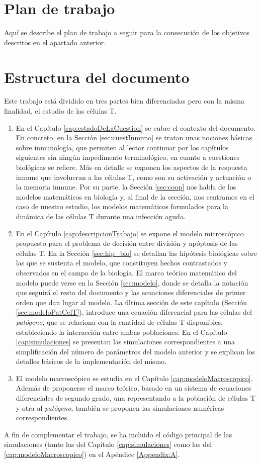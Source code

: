 \section{Plan de trabajo}
Aquí se describe el plan de trabajo a seguir para la consecución de los objetivos descritos en el apartado anterior.

\section{Estructura del documento}

Este trabajo está dividido en tres partes bien diferenciadas pero con la misma finalidad, el estudio de las células T. 

\begin{enumerate}
	\item En el Capítulo \ref{cap:estadoDeLaCuestion} se cubre el contexto del documento. En concreto, en la Sección \ref{sec:cuestInmuno} se tratan unas nociones básicas sobre inmunología, que permiten al lector continuar por los capítulos siguientes sin ningún impedimento terminológico, en cuanto a cuestiones biológicas se refiere. Más en detalle se exponen los aspectos de la respuesta inmune que involucran a las células T, como son su activación y actuación o la memoria inmune. Por su parte, la Sección \ref{sec:coop} nos habla de los modelos matemáticos en biología y, al final de la sección, nos centramos en el caso de nuestro estudio, los modelos matemáticos formulados para la dinámica de las células T durante una infección aguda. 
	
	\item En el Capítulo \ref{cap:descripcionTrabajo} se expone el modelo microscópico propuesto para el problema de decisión entre división y apóptosis de las células T. En la Sección \ref{sec:hip_bio} se detallan las hipótesis biológicas sobre las que se sustenta el modelo, que constituyen hechos contrastados y observados en el campo de la biología. El marco teórico matemático del modelo puede verse en la Sección \ref{sec:modelo}, donde se detalla la notación que seguirá el resto del documento y las ecuaciones diferenciales de primer orden que dan lugar al modelo. La última sección de este capítulo (Sección \ref{sec:modeloPatCelT}), introduce una ecuación diferencial para las células del \textit{patógeno}, que se relaciona con la cantidad de células T disponibles, estableciendo la interacción entre ambas poblaciones. En el Capítulo \ref{cap:simulaciones} se presentan las simulaciones correspondientes a una simplificación del número de parámetros del modelo anterior y se explican los detalles básicos de la implementación del mismo.
	
	\item El modelo macroscópico se estudia en el Capítulo \ref{cap:modeloMacroscopico}. Además de proponerse el marco teórico, basado en un sistema de ecuaciones diferenciales de segundo grado, una representando a la población de células T y otra al \textit{patógeno}, también se proponen las simulaciones numéricas correspondientes. 
\end{enumerate}

A fin de complementar el trabajo, se ha incluido el código principal de las simulaciones (tanto las del Capítulo \ref{cap:simulaciones} como las del \ref{cap:modeloMacroscopico}) en el Apéndice \ref{Appendix:A}.






